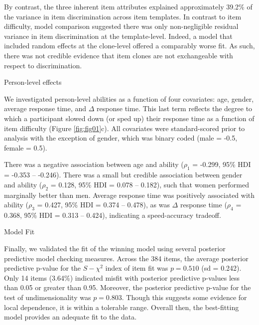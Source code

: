 \documentclass[a4paper,man,natbib]{apa6}
\makeatletter
\renewcommand{\subsubsection}{\@startsection{subsubsection}{3}
  {\z@}%
  {\b@level@two@skip}{\e@level@two@skip}%
  {\normalfont\normalsize\bfseries}}
\makeatother
\begin{document}
By contrast, the three inherent item attributes explained  approximately 39.2\% of the variance in item discrimination across item templates. In contrast to item difficulty, model comparison suggested there was only non-negligible residual variance in item discrimination at the template-level. Indeed, a model that included random effects at the clone-level offered a comparably worse fit. As such, there was not credible evidence that item clones are not exchangeable with respect to discrimination. 

\subsubsection{Person-level effects}

We investigated person-level abilities as a function of four covariates: age, gender, average response time, and $\Delta$ response time. This last term reflects the degree to which a participant slowed down (or sped up) their response time as a function of item difficulty (Figure \ref{fig:fig01}c). All covariates were standard-scored prior to analysis with the exception of gender, which was binary coded (male = -0.5, female = 0.5).

There was a negative association between age and ability ($\rho_1$ = -0.299, 95\% HDI = -0.353 -- -0.246). There was a small but credible association between gender and ability ($\rho_2$ = 0.128, 95\% HDI = 0.078 -- 0.182), such that women performed marginally better than men. Average response time was positively associated with ability ($\rho_3$ = 0.427, 95\% HDI = 0.374 -- 0.478), as was $\Delta$ response time ($\rho_4$ = 0.368, 95\% HDI = 0.313 -- 0.424), indicating a speed-accuracy tradeoff. 

\subsubsection{Model Fit}

Finally, we validated the fit of the winning model using several posterior predictive model checking measures. Across the 384 items, the average posterior predictive p-value for the $S-\chi^2$ index of item fit was $p = 0.510$ (sd = 0.242). Only 14 items (3.64\%) indicated misfit with posterior predictive p-values less than 0.05 or greater than 0.95. Moreover, the posterior predictive p-value for the test of undimensionality was $p = 0.803$. Though this suggests some evidence for local dependence, it is within a tolerable range. Overall then, the best-fitting model provides an adequate fit to the data.
\end{document}

